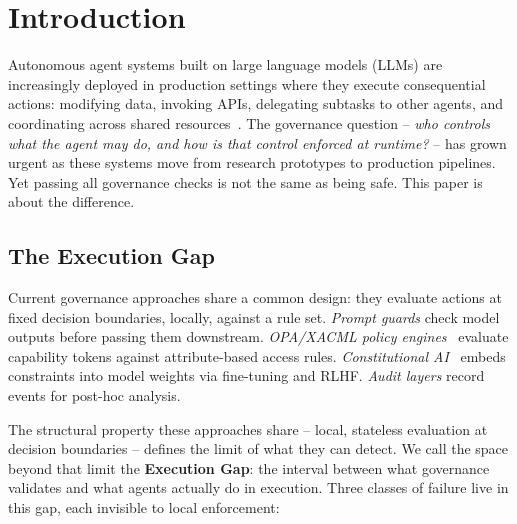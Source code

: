 \documentclass[11pt]{article}
\begin{document}
\tableofcontents
\newpage

\section{Introduction}
\label{sec:intro}

Autonomous agent systems built on large language models (LLMs) are increasingly
deployed in production settings where they execute consequential actions:
modifying data, invoking APIs, delegating subtasks to other agents, and
coordinating across shared resources~\cite{yao2023react,weng2023agent}.
The governance question -- \emph{who controls what the agent may do, and how is
that control enforced at runtime?} -- has grown urgent as these systems move
from research prototypes to production pipelines.
Yet passing all governance checks is not the same as being safe.
This paper is about the difference.

\subsection*{The Execution Gap}

Current governance approaches share a common design: they evaluate actions
at fixed decision boundaries, locally, against a rule set.
\emph{Prompt guards} check model outputs before passing them downstream.
\emph{OPA/XACML policy engines}~\cite{openpolicyagent2023,anderson2004extensible}
evaluate capability tokens against attribute-based access rules.
\emph{Constitutional AI}~\cite{bai2022constitutional} embeds constraints into
model weights via fine-tuning and RLHF.
\emph{Audit layers} record events for post-hoc analysis.

The structural property these approaches share -- local, stateless evaluation
at decision boundaries -- defines the limit of what they can detect.
We call the space beyond that limit the \textbf{Execution Gap}: the interval
between what governance validates and what agents actually do in execution.
Three classes of failure live in this gap, each invisible to local enforcement:
\end{document}
